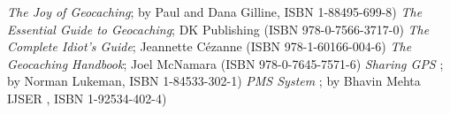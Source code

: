 \begin{thebibliography}{99}
\lhead{}\markboth{\bibname}{}


\emph{The Joy of Geocaching};  by Paul and Dana Gilline, ISBN 1-88495-699-8)
\emph{The Essential Guide to Geocaching};  DK Publishing (ISBN 978-0-7566-3717-0)
\emph{The Complete Idiot's Guide};  Jeannette Cézanne (ISBN 978-1-60166-004-6)
\emph{The Geocaching Handbook}; Joel McNamara (ISBN 978-0-7645-7571-6)
\emph{Sharing GPS };  by Norman Lukeman, ISBN 1-84533-302-1)
\emph{PMS System };  by Bhavin Mehta IJSER , ISBN 1-92534-402-4)






\end{thebibliography}